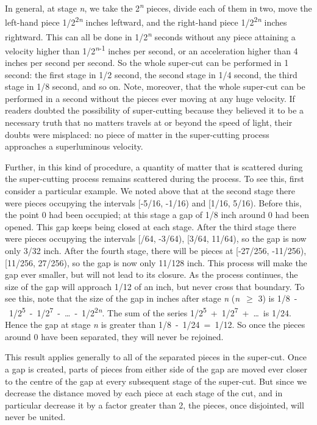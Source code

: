 \documentclass[
  10pt,
  letterpaper,
  DIV=11,
  numbers=noendperiod,
  twoside]{scrartcl}
\begin{document}
In general, at stage \emph{n}, we take the 2\textsuperscript{\emph{n}}
pieces, divide each of them in two, move the left-hand piece
1/2\textsuperscript{2\emph{n}} inches leftward, and the right-hand piece
1/2\textsuperscript{2\emph{n}} inches rightward. This can all be done in
1/2\textsuperscript{\emph{n}} seconds without any piece attaining a
velocity higher than 1/2\textsuperscript{\emph{n}-1} inches per second,
or an acceleration higher than 4 inches per second per second. So the
whole super-cut can be performed in 1 second: the first stage in 1/2
second, the second stage in 1/4 second, the third stage in 1/8 second,
and so on. Note, moreover, that the whole super-cut can be performed in
a second without the pieces ever moving at any huge velocity. If readers
doubted the possibility of super-cutting because they believed it to be
a necessary truth that no matters travels at or beyond the speed of
light, their doubts were misplaced: no piece of matter in the
super-cutting process approaches a superluminous velocity.

Further, in this kind of procedure, a quantity of matter that is
scattered during the super-cutting process remains scattered during the
process. To see this, first consider a particular example. We noted
above that at the second stage there were pieces occupying the intervals
{[}-5/16, -1/16) and {[}1/16, 5/16). Before this, the point 0 had been
occupied; at this stage a gap of 1/8 inch around 0 had been opened. This
gap keeps being closed at each stage. After the third stage there were
pieces occupying the intervals {[}/64, -3/64), {[}3/64, 11/64), so the
gap is now only 3/32 inch. After the fourth stage, there will be pieces
at {[}-27/256, -11/256), {[}11/256, 27/256), so the gap is now only
11/128 inch. This process will make the gap ever smaller, but will not
lead to its closure. As the process continues, the size of the gap will
approach 1/12 of an inch, but never cross that boundary. To see this,
note that the size of the gap in inches after stage \emph{n}
(\emph{n}~\({\geq}\) 3) is
1/8~-~1/2\textsuperscript{5}~-~1/2\textsuperscript{7}~-~\ldots~-~1/2\textsuperscript{2\emph{n}}.
The sum of the series
1/2\textsuperscript{5}~+~1/2\textsuperscript{7}~+~\ldots~is 1/24. Hence
the gap at stage \emph{n} is greater than 1/8~-~1/24~=~1/12. So once the
pieces around 0 have been separated, they will never be rejoined.

This result applies generally to all of the separated pieces in the
super-cut. Once a gap is created, parts of pieces from either side of
the gap are moved ever closer to the centre of the gap at every
subsequent stage of the super-cut. But since we decrease the distance
moved by each piece at each stage of the cut, and in particular decrease
it by a factor greater than 2, the pieces, once disjointed, will never
be united.
\end{document}
